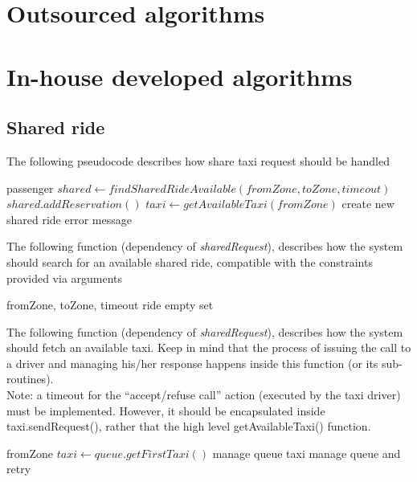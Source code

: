\section{Outsourced algorithms}

\section{In-house developed algorithms}
\subsection{Shared ride}
The following pseudocode describes how share taxi request should be handled
\begin{algorithmic}
  {passenger}
  \State $ shared \gets findSharedRideAvailable(fromZone, toZone, timeout) $
    \State $ shared.addReservation() $
  \Else
    \State $ taxi \gets getAvailableTaxi(fromZone) $
      \State create new shared ride
    \Else
      \State error message
    \EndIf
  \EndIf
 \EndFunction
\end{algorithmic}
\vspace{5mm}

The following function (dependency of \textit{sharedRequest}), describes how the system should search for an
available shared ride, compatible with the constraints provided via arguments
\begin{algorithmic}
  {fromZone, toZone, timeout}
	    \State \Return ride
	  \EndIf
	\EndIf
      \EndIf
    \EndIf
  \EndFor
  \State \Return empty set
 \EndFunction
\end{algorithmic}
\vspace{5mm}

The following function (dependency of \textit{sharedRequest}), describes how the system should fetch an available taxi.
Keep in mind that the process of issuing the call to a driver and managing his/her response happens inside this function
(or its sub-routines). \\
Note: a timeout for the ``accept/refuse call'' action (executed by the taxi driver) must be implemented. However, it
should be encapsulated inside taxi.sendRequest(), rather that the high level getAvailableTaxi() function.
\begin{algorithmic}
 {fromZone}
       \State $ taxi \gets queue.getFirstTaxi() $
         \State manage queue
         \Return taxi
     \Else 
         \State manage queue and retry
    \EndIf
\EndIf
\EndFor
\EndFunction


\end{algorithmic}

